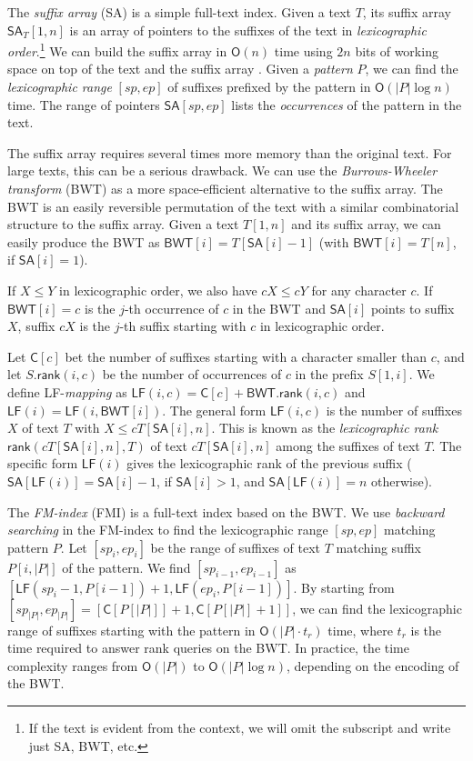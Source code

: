 \documentclass[smallabstract,smallcaptions]{dccpaper}
\newcommand{\abs}[1]{\ensuremath{\lvert #1 \rvert}}
\newcommand{\Oh}{\ensuremath{\mathsf{O}}}
\newcommand{\SA}{\textsf{SA}}
\newcommand{\BWT}{\textsf{BWT}}
\newcommand{\FMI}{\textsf{FMI}}
\newcommand{\mSA}{\ensuremath{\mathsf{SA}}}
\newcommand{\mBWT}{\ensuremath{\mathsf{BWT}}}
\newcommand{\mC}{\ensuremath{\mathsf{C}}}
\newcommand{\LF}{\textsf{LF}}
\newcommand{\rank}{\textsf{rank}}
\newcommand{\mLF}{\ensuremath{\mathsf{LF}}}
\newcommand{\mrank}{\ensuremath{\mathsf{rank}}}
\begin{document}
The \emph{suffix array} (\SA) \cite{Manber1993} is a simple full-text index. Given a text $T$, its suffix array $\mSA_{T}[1,n]$ is an array of pointers to the suffixes of the text in \emph{lexicographic order}.\footnote{If the text is evident from the context, we will omit the subscript and write just \SA{}, \BWT{}, etc.} We can build the suffix array in $\Oh(n)$ time using $2n$ bits of working space on top of the text and the suffix array \cite{Nong2011}. Given a \emph{pattern} $P$, we can find the \emph{lexicographic range} $[sp,ep]$ of suffixes prefixed by the pattern in $\Oh(\abs{P} \log n)$ time. The range of pointers $\mSA[sp,ep]$ lists the \emph{occurrences} of the pattern in the text.

The suffix array requires several times more memory than the original text. For large texts, this can be a serious drawback. We can use the \emph{Burrows-Wheeler transform} (\BWT) \cite{Burrows1994} as a more space-efficient alternative to the suffix array. The \BWT{} is an easily reversible permutation of the text with a similar combinatorial structure to the suffix array. Given a text $T[1,n]$ and its suffix array, we can easily produce the \BWT{} as $\mBWT[i] = T[\mSA[i]-1]$ (with $\mBWT[i] = T[n]$, if $\mSA[i] = 1$).

If $X \le Y$ in lexicographic order, we also have $cX \le cY$ for any character $c$. If $\mBWT[i] = c$ is the $j$\nobreakdash-th occurrence of $c$ in the \BWT{} and $\mSA[i]$ points to suffix $X$, suffix $cX$ is the $j$\nobreakdash-th suffix starting with $c$ in lexicographic order.

Let $\mC[c]$ bet the number of suffixes starting with a character smaller than $c$, and let $S.\mrank(i,c)$ be the number of occurrences of $c$ in the prefix $S[1,i]$. We define \LF-\emph{mapping} as $\mLF(i,c) = \mC[c] + \mBWT.\mrank(i, c)$ and $\mLF(i) = \mLF(i,\mBWT[i])$. The general form $\mLF(i,c)$ is the number of suffixes $X$ of text $T$ with $X \le cT[\mSA[i],n]$. This is known as the  \emph{lexicographic rank} $\mrank(cT[\mSA[i],n],T)$ of text $cT[\mSA[i],n]$ among the suffixes of text $T$. The specific form $\mLF(i)$ gives the lexicographic rank of the previous suffix ($\mSA[\mLF(i)] = \mSA[i]-1$, if $\mSA[i] > 1$, and $\mSA[\mLF(i)] = n$ otherwise).

The \emph{FM-index} (\FMI) \cite{Ferragina2005a} is a full-text index based on the \BWT{}. We use \emph{backward searching} in the FM-index to find the lexicographic range $[sp,ep]$ matching pattern $P$. Let $[sp_{i},ep_{i}]$ be the range of suffixes of text $T$ matching suffix $P[i, \abs{P}]$ of the pattern. We find $[sp_{i-1},ep_{i-1}]$ as $[\mLF(sp_{i}-1, P[i-1]) + 1, \mLF(ep_{i}, P[i-1])]$. By starting from $[sp_{\abs{P}}, ep_{\abs{P}}] = [\mC[P[\abs{P}]]+1, \mC[P[\abs{P}]+1]]$, we can find the lexicographic range of suffixes starting with the pattern in $\Oh(\abs{P} \cdot t_{r})$ time, where $t_{r}$ is the time required to answer \rank{} queries on the \BWT. In practice, the time complexity ranges from $\Oh(\abs{P})$ to $\Oh(\abs{P} \log n)$, depending on the encoding of the \BWT{}.
\end{document}
